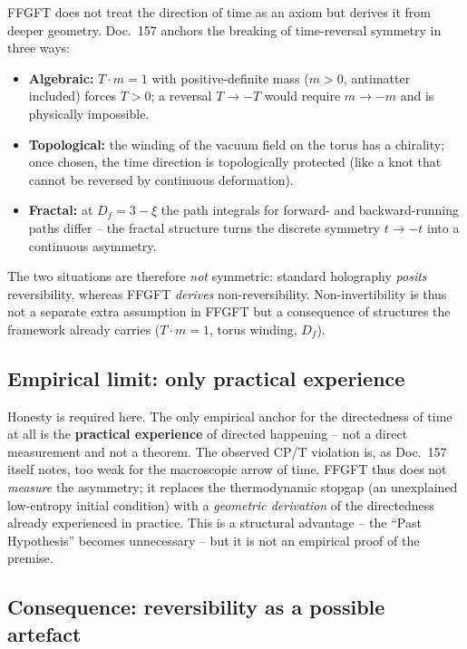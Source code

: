 FFGFT does not treat the direction of time as an axiom but derives it from
deeper geometry. Doc.~157 anchors the breaking of time-reversal symmetry in
three ways:

\begin{itemize}
  \item \textbf{Algebraic:} $T \cdot m = 1$ with positive-definite mass
        ($m > 0$, antimatter included) forces $T > 0$; a reversal
        $T \to -T$ would require $m \to -m$ and is physically impossible.
  \item \textbf{Topological:} the winding of the vacuum field on the torus has
        a chirality; once chosen, the time direction is topologically
        protected (like a knot that cannot be reversed by continuous
        deformation).
  \item \textbf{Fractal:} at $D_f = 3 - \xi$ the path integrals for
        forward- and backward-running paths differ -- the fractal structure
        turns the discrete symmetry $t \to -t$ into a continuous asymmetry.
\end{itemize}

\noindent
The two situations are therefore \emph{not} symmetric: standard holography
\emph{posits} reversibility, whereas FFGFT \emph{derives} non-reversibility.
Non-invertibility is thus not a separate extra assumption in FFGFT but a
consequence of structures the framework already carries ($T\cdot m=1$, torus
winding, $D_f$).

\subsection*{Empirical limit: only practical experience}

Honesty is required here. The only empirical anchor for the directedness of
time at all is the \textbf{practical experience} of directed happening -- not
a direct measurement and not a theorem. The observed CP/T violation is, as
Doc.~157 itself notes, too weak for the macroscopic arrow of time. FFGFT thus
does not \emph{measure} the asymmetry; it replaces the thermodynamic stopgap
(an unexplained low-entropy initial condition) with a \emph{geometric
derivation} of the directedness already experienced in practice. This is a
structural advantage -- the \enquote{Past Hypothesis} becomes unnecessary --
but it is not an empirical proof of the premise.

\subsection*{Consequence: reversibility as a possible artefact}

